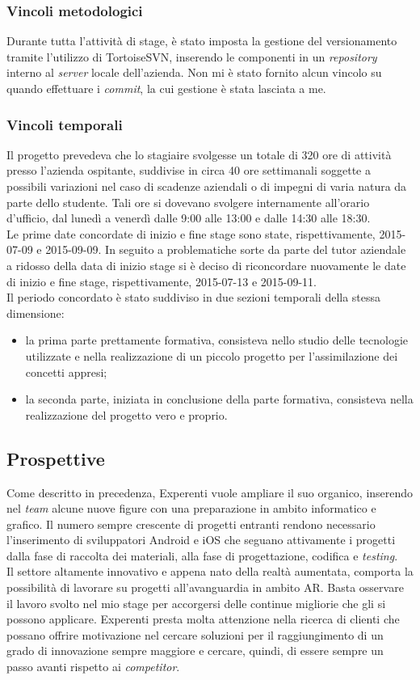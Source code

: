 \subsubsection{Vincoli metodologici}
Durante tutta l’attività di stage, \`e stato imposta la gestione del versionamento tramite l'utilizzo di TortoiseSVN, inserendo le componenti in un \textit{repository} interno al \textit{server} locale dell'azienda. Non mi \`e stato fornito alcun vincolo su quando effettuare i \textit{commit}, la cui gestione \`e stata lasciata a me.

\subsubsection{Vincoli temporali}
Il progetto prevedeva che lo stagiaire svolgesse un totale di 320 ore di attività presso l’azienda ospitante, suddivise in circa 40 ore settimanali soggette a possibili variazioni nel caso di scadenze aziendali o di impegni di varia natura da parte dello studente. Tali ore si dovevano svolgere internamente all’orario d’ufficio, dal lunedì a venerdì dalle 9:00 alle 13:00 e dalle 14:30 alle 18:30.
\\
Le prime date concordate di inizio e fine stage sono state, rispettivamente, 2015-07-09 e 2015-09-09. In seguito a problematiche sorte da parte del tutor aziendale a ridosso della data di inizio stage si \`e deciso di riconcordare nuovamente le date di inizio e fine stage, rispettivamente, 2015-07-13 e 2015-09-11. 
\\
Il periodo concordato \`e stato suddiviso in due sezioni temporali della stessa dimensione:
\begin{itemize}
	\item la prima parte prettamente formativa, consisteva nello studio delle tecnologie utilizzate e nella realizzazione di un piccolo progetto per l'assimilazione dei concetti appresi;
	\item la seconda parte, iniziata in conclusione della parte formativa, consisteva nella realizzazione del progetto vero e proprio.
\end{itemize}

\subsection{Prospettive}
Come descritto in precedenza, Experenti vuole ampliare il suo organico, inserendo nel \textit{team} alcune nuove figure con una preparazione in ambito informatico e grafico. Il numero sempre crescente di progetti entranti rendono necessario l'inserimento di sviluppatori Android e iOS che seguano attivamente i progetti dalla fase di raccolta dei materiali, alla fase di progettazione, codifica e \textit{testing}.
\\
Il settore altamente innovativo e appena nato della realt\`a aumentata, comporta la possibilit\`a di lavorare su progetti all'avanguardia in ambito AR. Basta osservare il lavoro svolto nel mio stage per accorgersi delle continue migliorie che gli si possono applicare. Experenti presta molta attenzione nella ricerca di clienti che possano offrire motivazione nel cercare soluzioni per il raggiungimento di un grado di innovazione sempre maggiore e cercare, quindi, di essere sempre un passo avanti rispetto ai \textit{competitor}.